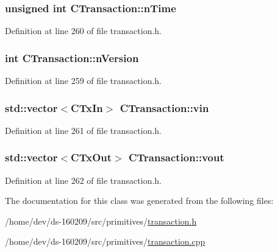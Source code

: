 \subsubsection[{n\+Time}]{\setlength{\rightskip}{0pt plus 5cm}unsigned int C\+Transaction\+::n\+Time}\label{class_c_transaction_a8ccb4b6020669bc562095e3417715e41}


Definition at line 260 of file transaction.\+h.

\hypertarget{class_c_transaction_a6c29bdd822859c7b21b7b6c22dca6825}{}
\subsubsection[{n\+Version}]{\setlength{\rightskip}{0pt plus 5cm}int C\+Transaction\+::n\+Version}\label{class_c_transaction_a6c29bdd822859c7b21b7b6c22dca6825}


Definition at line 259 of file transaction.\+h.

\hypertarget{class_c_transaction_a53fa787e4ea57374b4fa2a28e9a957b2}{}
\subsubsection[{vin}]{\setlength{\rightskip}{0pt plus 5cm}std\+::vector$<${\bf C\+Tx\+In}$>$ C\+Transaction\+::vin}\label{class_c_transaction_a53fa787e4ea57374b4fa2a28e9a957b2}


Definition at line 261 of file transaction.\+h.

\hypertarget{class_c_transaction_ae42c0032a464c3054c508017c7d040ef}{}
\subsubsection[{vout}]{\setlength{\rightskip}{0pt plus 5cm}std\+::vector$<${\bf C\+Tx\+Out}$>$ C\+Transaction\+::vout}\label{class_c_transaction_ae42c0032a464c3054c508017c7d040ef}


Definition at line 262 of file transaction.\+h.



The documentation for this class was generated from the following files\+:\begin{DoxyCompactItemize}
\item 
/home/dev/ds-\/160209/src/primitives/\hyperlink{transaction_8h}{transaction.\+h}\item 
/home/dev/ds-\/160209/src/primitives/\hyperlink{transaction_8cpp}{transaction.\+cpp}\end{DoxyCompactItemize}
